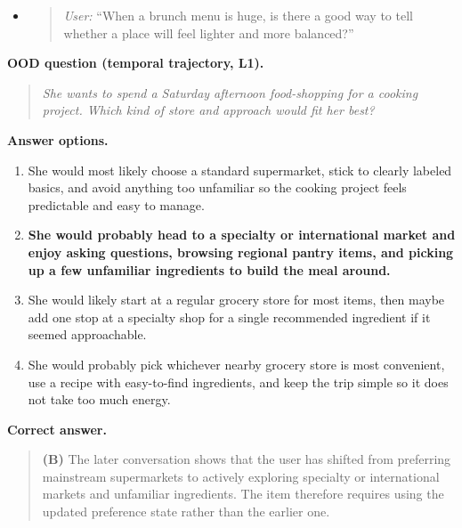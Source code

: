 \documentclass{article}
\begin{document}
\begin{tcolorbox}
\begin{itemize}[leftmargin=1.5em]
    \item
    \begin{quote}
    \textit{User:} ``When a brunch menu is huge, is there a good way to tell whether a place will feel lighter and more balanced?''
    \end{quote}
\end{itemize}

\vspace{0.5em}
\textbf{OOD question (temporal trajectory, L1).}

\begin{quote}
\textit{She wants to spend a Saturday afternoon food-shopping for a cooking project. Which kind of store and approach would fit her best?}
\end{quote}

\textbf{Answer options.}
\begin{enumerate}[label=(\Alph*), leftmargin=2em]
    \item She would most likely choose a standard supermarket, stick to clearly labeled basics, and avoid anything too unfamiliar so the cooking project feels predictable and easy to manage.
    \item \textbf{She would probably head to a specialty or international market and enjoy asking questions, browsing regional pantry items, and picking up a few unfamiliar ingredients to build the meal around.}
    \item She would likely start at a regular grocery store for most items, then maybe add one stop at a specialty shop for a single recommended ingredient if it seemed approachable.
    \item She would probably pick whichever nearby grocery store is most convenient, use a recipe with easy-to-find ingredients, and keep the trip simple so it does not take too much energy.
\end{enumerate}

\textbf{Correct answer.}
\begin{quote}
\textbf{(B)} The later conversation shows that the user has shifted from preferring mainstream supermarkets to actively exploring specialty or international markets and unfamiliar ingredients. The item therefore requires using the updated preference state rather than the earlier one.
\end{quote}

\end{tcolorbox}























% 
\end{document}
